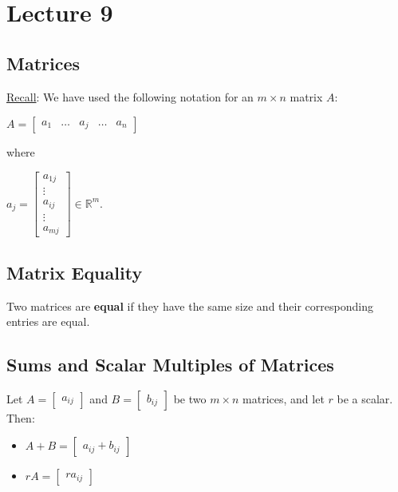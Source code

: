 \documentclass[12pt, letterpaper]{article}
\begin{document}
\section*{Lecture 9}

\subsection*{Matrices}

\underline{Recall}: We have used the following notation for an $ m
\times n $ matrix $ A $:

\medskip
{\centering

  $ A =
  \begin{bmatrix} a_1 & \hdots & a_j & \hdots & a_n
  \end{bmatrix} $

}
\medskip

where

\medskip
{\centering

  $ a_j =
  \begin{bmatrix} a_{1j} \\ \vdots \\ a_{ij} \\ \vdots \\ a_{mj}
  \end{bmatrix} \in \mathbb{R}^m $.

}
\medskip

\subsection*{Matrix Equality}

Two matrices are \textbf{equal} if they have the same size and their
corresponding entries are equal.

\subsection*{Sums and Scalar Multiples of Matrices}

Let $ A =
\begin{bmatrix} a_{ij}
\end{bmatrix} $ and $ B =
\begin{bmatrix} b_{ij}
\end{bmatrix} $ be two $ m \times n $ matrices, and let $ r $ be a scalar. Then:

\begin{itemize}
  \item $ A + B =
    \begin{bmatrix} a_{ij} + b_{ij}
    \end{bmatrix} $
  \item $ rA =
    \begin{bmatrix} ra_{ij}
    \end{bmatrix} $
\end{itemize}
\end{document}
